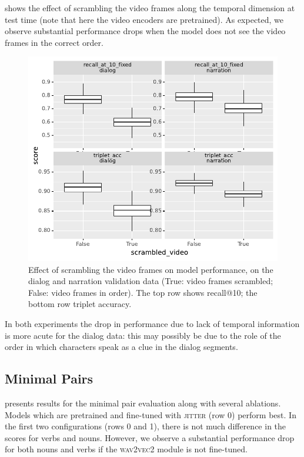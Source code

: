  shows the effect of scrambling the video frames 
along the temporal dimension at test time (note that here the video encoders 
are pretrained). As expected, we observe substantial 
performance drops when the model does not see the video frames in 
the correct order. 
\begin{figure}[htb]
	\centering
	\includegraphics[width=\columnwidth]{results/ablations/scrambled_video.pdf}
	\caption{Effect of scrambling the video frames on model performance, on the 
	dialog and narration validation data (True: video frames scrambled;
        False: video frames in order). The top row shows recall@10;
		the bottom row triplet accuracy.}
	\label{fig:scrambled_video}
\end{figure}
In both experiments the drop in performance due to lack of temporal
information is more acute for the dialog data: this may possibly be due to the
role of the order in which characters speak as a clue in the
dialog segments.

\subsection{Minimal Pairs}
\label{sec:minimal-pairs}


 presents results for the minimal pair 
evaluation along with several ablations. Models which are 
pretrained and fine-tuned with \textsc{jitter} (row 0) perform best. In the 
first two configurations (rows 0 and 1), there is not much difference in the scores for 
verbs and nouns. However, we observe a substantial performance drop for both nouns and verbs if 
the \textsc{wav2vec2} module is not fine-tuned.

